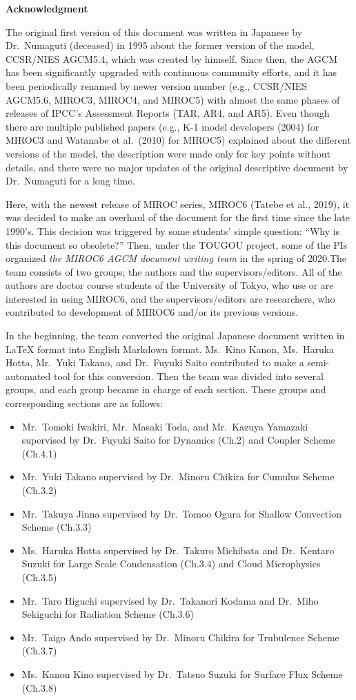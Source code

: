 \textbf{Acknowledgment}

The original first version of this document was written in Japanese by
Dr.~Numaguti (deceased) in 1995 about the former version of the model,
CCSR/NIES AGCM5.4, which was created by himself. Since then, the AGCM
has been significantly upgraded with continuous community efforts, and
it has been periodically renamed by newer version number (e.g.,
CCSR/NIES AGCM5.6, MIROC3, MIROC4, and MIROC5) with almost the same
phases of releases of IPCC's Assessment Reports (TAR, AR4, and AR5).
Even though there are multiple published papers (e.g., K-1 model
developers (2004) for MIROC3 and Watanabe et al.~(2010) for MIROC5)
explained about the different versions of the model, the description
were made only for key points without details, and there were no major
updates of the original descriptive document by Dr.~Numaguti for a long
time.

Here, with the newest release of MIROC series, MIROC6 (Tatebe et al.,
2019), it was decided to make an overhaul of the document for the first
time since the late 1990's. This decision was triggered by some
students' simple question: ``Why is this document so obsolete?'' Then,
under the TOUGOU project, some of the PIs organized \emph{the MIROC6
AGCM document writing team} in the spring of 2020.The team consists of
two groups; the authors and the supervisors/editors. All of the authors
are doctor course students of the University of Tokyo, who use or are
interested in using MIROC6, and the supervisors/editors are researchers,
who contributed to development of MIROC6 and/or its previous versions.

In the beginning, the team converted the original Japanese document
written in LaTeX format into English Markdown format. Ms.~Kino Kanon,
Ms.~Haruka Hotta, Mr.~Yuki Takano, and Dr.~Fuyuki Saito contributed to
make a semi-automated tool for this conversion. Then the team was
divided into several groups, and each group became in charge of each
section. These groups and corresponding sections are as follows:

\begin{itemize}
\item
  Mr.~Tomoki Iwakiri, Mr.~Masaki Toda, and Mr.~Kazuya Yamazaki
  supervised by Dr.~Fuyuki Saito for Dynamics (Ch.2) and Coupler Scheme
  (Ch.4.1)
\item
  Mr.~Yuki Takano supervised by Dr.~Minoru Chikira for Cumulus Scheme
  (Ch.3.2)
\item
  Mr.~Takuya Jinna supervised by Dr.~Tomoo Ogura for Shallow Convection
  Scheme (Ch.3.3)
\item
  Ms.~Haruka Hotta supervised by Dr.~Takuro Michibata and Dr.~Kentaro
  Suzuki for Large Scale Condensation (Ch.3.4) and Cloud Microphysics
  (Ch.3.5)
\item
  Mr.~Taro Higuchi supervised by Dr.~Takanori Kodama and Dr.~Miho
  Sekiguchi for Radiation Scheme (Ch.3.6)
\item
  Mr.~Taigo Ando supervised by Dr.~Minoru Chikira for Trubulence Scheme
  (Ch.3.7)
\item
  Ms.~Kanon Kino supervised by Dr.~Tatsuo Suzuki for Surface Flux Scheme
  (Ch.3.8)
\end{itemize}


